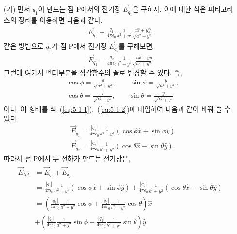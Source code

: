 \documentclass[tightenlines,floatfix,nofootinbib,superscriptaddress,fleqn]{revtex4}
\begin{document}
\begin{itemize}
\item[(가)] 
  먼저 $q_1$이 만드는 점 P에서의 전기장 $\vec{E}_{q_1}$을 구하자. 이에 대한 식은 피타고라스의 정리를 이용하면 다음과 같다.
  \begin{align}\label{eq:5-1-1}
    \vec{E}_{q_1}=\frac{q_1}{4\pi\epsilon_0}\frac{1}{a^2+y^2}\frac{a\hat{x}+y\hat{y}}{\sqrt{a^2+y^2}}
  \end{align}
  같은 방법으로 $q_2$가 점 P에서 전기장 $\vec{E}_{q_2}$를 구해보면,
  \begin{align}\label{eq:5-1-2}
    \vec{E}_{q_2}=\frac{q_2}{4\pi\epsilon_0}\frac{1}{b^2+y^2}\frac{-b\hat{x}+y\hat{y}}{\sqrt{a^2+y^2}}
  \end{align}
  그런데 여기서 벡터부분을 삼각함수의 꼴로 변경할 수 있다. 즉,
  \begin{align}\label{eq:5-1}
    &\cos{\phi}=\frac{a}{\sqrt{a^2+y^2}}, \qquad \sin{\phi}=\frac{y}{\sqrt{a^2+y^2}},\\
    &\cos{\theta}=\frac{b}{\sqrt{b^2+y^2}}, \qquad \sin{\theta}=\frac{y}{\sqrt{b^2+y^2}} 
  \end{align}
  이다. 이 형태를 식~(\ref{eq:5-1-1}),~(\ref{eq:5-1-2})에 대입하여 다음과 같이 바꿔 쓸 수 있다.
  \begin{align}
    &\vec{E}_{q_1}=\frac{\left|q_1\right|}{4\pi\epsilon_0}\frac{1}{a^2+y^2}\left(\cos{\phi}\hat{x}+\sin{\phi}\hat{y}\right)\\
    &\vec{E}_{q_2}=\frac{\left|q_2\right|}{4\pi\epsilon_0}\frac{1}{b^2+y^2}\left(\cos{\theta}\hat{x}-\sin{\theta}\hat{y}\right).
  \end{align}
  따라서 점 P에서 두 전하가 만드는 전기장은,
  \begin{align}\label{eq:5-2}
    \begin{split}
      \vec{E}_{tot}&=\vec{E}_{q_1}+\vec{E}_{q_2}\\
      &=\frac{\left|q_1\right|}{4\pi\epsilon_0}\frac{1}{a^2+y^2}\left(\cos{\phi}\hat{x}+\sin{\phi}\hat{y}\right)+
      \frac{\left|q_2\right|}{4\pi\epsilon_0}\frac{1}{b^2+y^2}\left(\cos{\theta}\hat{x}-\sin{\theta}\hat{y}\right)\\
      &=\left(\frac{\left|q_1\right|}{4\pi\epsilon_0}\frac{1}{a^2+y^2}\cos{\phi}+\frac{\left|q_2\right|}{4\pi\epsilon_0}\frac{1}{b^2+y^2}\cos{\theta}\right)\hat{x}\\
      &+\left(\frac{\left|q_1\right|}{4\pi\epsilon_0}\frac{1}{a^2+y^2}\sin{\phi}-\frac{\left|q_2\right|}{4\pi\epsilon_0}\frac{1}{b^2+y^2}\sin{\theta}\right)\hat{y}
    \end{split}

\end{align}
\end{itemize}
\end{document}
